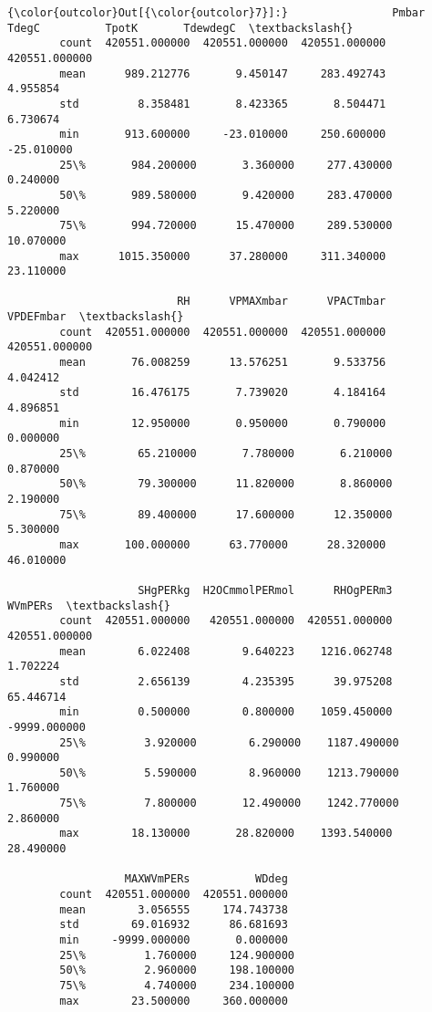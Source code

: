 \documentclass[11pt]{article}
\begin{document}
\begin{Verbatim}[commandchars=\\\{\}]
{\color{outcolor}Out[{\color{outcolor}7}]:}                Pmbar          TdegC          TpotK       TdewdegC  \textbackslash{}
        count  420551.000000  420551.000000  420551.000000  420551.000000   
        mean      989.212776       9.450147     283.492743       4.955854   
        std         8.358481       8.423365       8.504471       6.730674   
        min       913.600000     -23.010000     250.600000     -25.010000   
        25\%       984.200000       3.360000     277.430000       0.240000   
        50\%       989.580000       9.420000     283.470000       5.220000   
        75\%       994.720000      15.470000     289.530000      10.070000   
        max      1015.350000      37.280000     311.340000      23.110000   
        
                          RH      VPMAXmbar      VPACTmbar      VPDEFmbar  \textbackslash{}
        count  420551.000000  420551.000000  420551.000000  420551.000000   
        mean       76.008259      13.576251       9.533756       4.042412   
        std        16.476175       7.739020       4.184164       4.896851   
        min        12.950000       0.950000       0.790000       0.000000   
        25\%        65.210000       7.780000       6.210000       0.870000   
        50\%        79.300000      11.820000       8.860000       2.190000   
        75\%        89.400000      17.600000      12.350000       5.300000   
        max       100.000000      63.770000      28.320000      46.010000   
        
                    SHgPERkg  H2OCmmolPERmol      RHOgPERm3        WVmPERs  \textbackslash{}
        count  420551.000000   420551.000000  420551.000000  420551.000000   
        mean        6.022408        9.640223    1216.062748       1.702224   
        std         2.656139        4.235395      39.975208      65.446714   
        min         0.500000        0.800000    1059.450000   -9999.000000   
        25\%         3.920000        6.290000    1187.490000       0.990000   
        50\%         5.590000        8.960000    1213.790000       1.760000   
        75\%         7.800000       12.490000    1242.770000       2.860000   
        max        18.130000       28.820000    1393.540000      28.490000   
        
                  MAXWVmPERs          WDdeg  
        count  420551.000000  420551.000000  
        mean        3.056555     174.743738  
        std        69.016932      86.681693  
        min     -9999.000000       0.000000  
        25\%         1.760000     124.900000  
        50\%         2.960000     198.100000  
        75\%         4.740000     234.100000  
        max        23.500000     360.000000  
\end{Verbatim}
            
\end{document}
